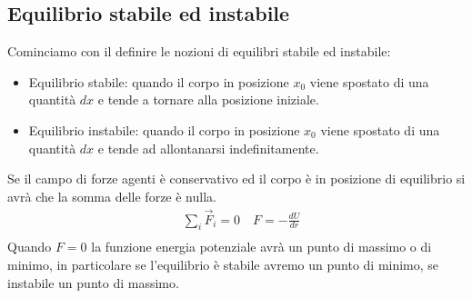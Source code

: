 \subsection{Equilibrio stabile ed instabile}
Cominciamo con il definire le nozioni di equilibri stabile ed instabile:\\
\begin{itemize}
\item Equilibrio stabile: quando il corpo in posizione $x_0$ viene spostato di una quantità $dx$ e tende a tornare alla posizione iniziale.
\item Equilibrio instabile: quando il corpo in posizione $x_0$ viene spostato di una quantità $dx$ e tende ad allontanarsi indefinitamente.
\end{itemize}
Se il campo di forze agenti è conservativo ed il corpo è in posizione di equilibrio si avrà che la somma delle forze è nulla. 
\begin{align*}
	&\sum_i \vec{F}_i = 0 \quad F = -\frac{dU}{dr}\\
\end{align*}
Quando $F = 0$ la funzione energia potenziale avrà un punto di massimo o di minimo, in particolare se l'equilibrio è stabile avremo un punto di minimo, se instabile un punto di massimo. 
